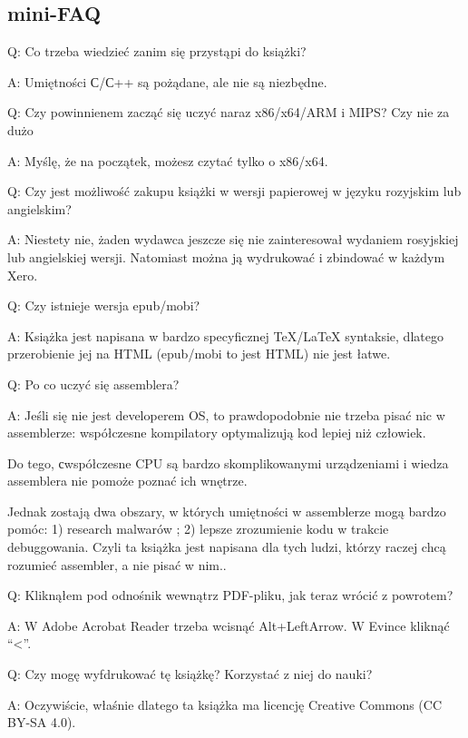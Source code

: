 \subsection*{mini-FAQ}

\par Q: Co trzeba wiedzieć zanim się przystąpi do książki?
\par A: Umiętności С/С++ są pożądane, ale nie są niezbędne.

\par Q: Czy powinnienem zacząć się uczyć naraz x86/x64/ARM i MIPS? Czy nie za dużo
\par A: Myślę, że na początek, możesz czytać tylko o x86/x64.

\par Q: Czy jest możliwość zakupu książki w wersji papierowej w języku rozyjskim lub angielskim?
\par A: Niestety nie, żaden wydawca jeszcze się nie zainteresował wydaniem rosyjskiej lub angielskiej wersji. Natomiast można ją wydrukować i zbindować w każdym Xero.

\par Q: Czy istnieje wersja epub/mobi?
\par A: Książka jest napisana w bardzo specyficznej TeX/LaTeX syntaksie, dlatego przerobienie jej na HTML (epub/mobi to jest HTML)
nie jest łatwe.

\par Q: Po co uczyć się assemblera?
\par A: Jeśli się nie jest developerem \ac{OS}, to prawdopodobnie nie trzeba pisać nic w assemblerze: współczesne kompilatory optymalizują kod lepiej niż człowiek.

Do tego, сwspółczesne \ac{CPU} są bardzo skomplikowanymi urządzeniami i wiedza assemblera nie pomoże poznać ich wnętrze.

Jednak zostają dwa obszary, w których umiętności w assemblerze mogą bardzo pomóc:
1) research malwarów ; 2) lepsze zrozumienie kodu w trakcie debuggowania.
Czyli ta książka jest napisana dla tych ludzi, którzy raczej chcą rozumieć assembler, a nie pisać w nim..

\par Q: Kliknąłem pod odnośnik wewnątrz PDF-pliku, jak teraz wrócić z powrotem?
\par A: W Adobe Acrobat Reader trzeba wcisnąć Alt+LeftArrow. W Evince kliknąć ``<''.

\par Q: Czy mogę wyfdrukować tę książkę? Korzystać z niej do nauki?
\par A: Oczywiście, właśnie dlatego ta książka ma licencję Creative Commons (CC BY-SA 4.0).

